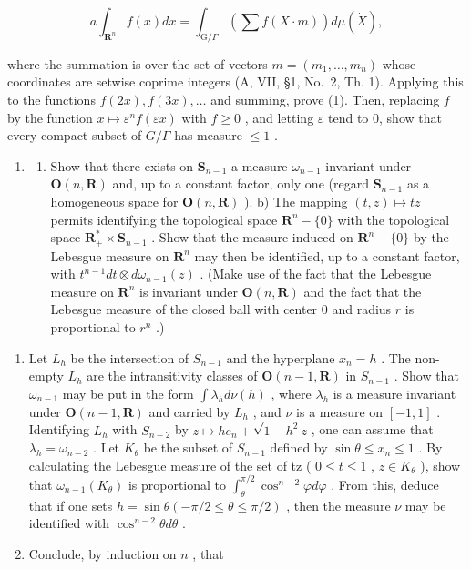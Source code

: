 \[
a \int_ {\mathbf {R} ^ {n}} f (x) d x = \int_ {\mathrm{G} / \Gamma} \left(\sum f (X \cdot m)\right) d \mu (\dot {X}),
\]

where the summation is over the set of vectors \(m = (m_1, \ldots, m_n)\) whose coordinates are setwise coprime integers (A, VII, §1, No.~2, Th. 1). Applying this to the functions \(f(2x), f(3x), \ldots\) and summing, prove (1). Then, replacing \(f\) by the function \(x \mapsto \varepsilon^n f(\varepsilon x)\) with \(f \geqslant 0\) , and letting \(\varepsilon\) tend to 0, show that every compact subset of \(G/\Gamma\) has measure \(\leqslant 1\) .

\begin{enumerate}
\def\labelenumi{\arabic{enumi})}
\setcounter{enumi}{7}
\tightlist
\item
  \begin{enumerate}
  \def\labelenumii{\alph{enumii})}
  \tightlist
  \item
    Show that there exists on \(\mathbf{S}_{n-1}\) a measure \(\omega_{n-1}\) invariant under \(\mathbf{O}(n,\mathbf{R})\) and, up to a constant factor, only one (regard \(\mathbf{S}_{n-1}\) as a homogeneous space for \(\mathbf{O}(n,\mathbf{R})\) ). b) The mapping \((t,z)\mapsto tz\) permits identifying the topological space \(\mathbf{R}^n -\{0\}\) with the topological space \(\mathbf{R}_+^*\times \mathbf{S}_{n-1}\) . Show that the measure induced on \(\mathbf{R}^n -\{0\}\) by the Lebesgue measure on \(\mathbf{R}^n\) may then be identified, up to a constant factor, with \(t^{n-1}dt\otimes d\omega_{n-1}(z)\) . (Make use of the fact that the Lebesgue measure on \(\mathbf{R}^n\) is invariant under \(\mathbf{O}(n,\mathbf{R})\) and the fact that the Lebesgue measure of the closed ball with center 0 and radius \(r\) is proportional to \(r^n\) .)
  \end{enumerate}
\end{enumerate}

\begin{enumerate}
\def\labelenumi{\alph{enumi})}
\setcounter{enumi}{2}
\item
  Let \(L_{h}\) be the intersection of \(S_{n-1}\) and the hyperplane \(x_{n}=h\) . The non-empty \(L_{h}\) are the intransitivity classes of \(\mathbf{O}(n-1,\mathbf{R})\) in \(S_{n-1}\) . Show that \(\omega_{n-1}\) may be put in the form \(\int\lambda_{h}d\nu(h)\) , where \(\lambda_{h}\) is a measure invariant under \(\mathbf{O}(n-1,\mathbf{R})\) and carried by \(L_{h}\) , and \(\nu\) is a measure on \([-1,1]\) . Identifying \(L_{h}\) with \(S_{n-2}\) by \(z\mapsto he_{n}+\sqrt{1-h^{2}}z\) , one can assume that \(\lambda_{h}=\omega_{n-2}\) . Let \(K_{\theta}\) be the subset of \(S_{n-1}\) defined by \(\sin\theta\leqslant x_{n}\leqslant1\) . By calculating the Lebesgue measure of the set of tz ( \(0\leqslant t\leqslant1\) , \(z\in K_{\theta}\) ), show that \(\omega_{n-1}(K_{\theta})\) is proportional to \(\int_{\theta}^{\pi/2}\cos^{n-2}\varphi d\varphi\) . From this, deduce that if one sets \(h=\sin\theta(-\pi/2\leqslant\theta\leqslant\pi/2)\) , then the measure \(\nu\) may be identified with \(\cos^{n-2}\theta d\theta\) .
\item
  Conclude, by induction on \(n\) , that
\end{enumerate}

